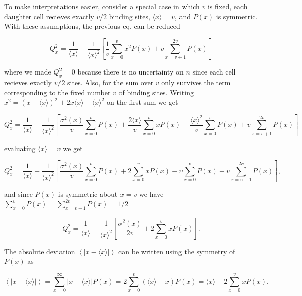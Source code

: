 To make interpretations easier, consider a special case in which $v$ is fixed, each daughter cell recieves exactly $v/2$ binding sites, $\langle x\rangle = v$, and $P(x)$ is symmetric. With these assumptions, the previous eq. can be reduced

\begin{equation*}
  Q_x^2 = \frac{1}{\langle x\rangle} - \frac{1}{\langle x\rangle^2}\left[\frac{1}{v}\sum_{x=0}^vx^2P(x)+v\sum_{x=v+1}^{2v}P(x)\right]
\end{equation*}

where we made $Q_v^2=0$ because there is no uncertainty on $n$ since each cell recieves exactly $v/2$ sites. Also, for the sum over $v$ only survives the term corresponding to the fixed number $v$ of binding sites. Writing $x^2 = \left(x-\langle x\rangle\right)^2 + 2x\langle x\rangle - \langle x\rangle^2$ on the first sum we get 

\begin{equation*}
  Q_x^2 = \frac{1}{\langle x\rangle}-\frac{1}{\langle x\rangle^2}\left[\frac{\sigma^2(x)}{v}\sum_{x=0}^vP(x)+\frac{2\langle x\rangle}{v}\sum_{x=0}^vxP(x)-\frac{\langle x\rangle^2}{v}\sum_{x=0}^vP(x)+v\sum_{x=v+1}^{2v}P(x)\right]
\end{equation*}

evaluating $\langle x\rangle = v$ we get

\begin{equation*}
  Q_x^2 = \frac{1}{\langle x\rangle}-\frac{1}{\langle x\rangle^2}\left[\frac{\sigma^2(x)}{v}\sum_{x=0}^vP(x)+2\sum_{x=0}^vxP(x)-v\sum_{x=0}^vP(x)+v\sum_{x=v+1}^{2v}P(x)\right],
\end{equation*}

and since $P(x)$ is symmetric about $x=v$ we have $\sum_{x=0}^vP(x) = \sum_{x=v+1}^{2v}P(x) = 1/2$

\begin{equation}
  Q_x^2 = \frac{1}{\langle x\rangle}-\frac{1}{\langle x\rangle^2}\left[\frac{\sigma^2(x)}{2v}+2\sum_{x=0}^vxP(x)\right].
\end{equation}

The absolute deviation $\left\langle\left|x-\langle x\rangle\right|\right\rangle$ can be written using the symmetry of $P(x)$ as

\begin{equation}
  \left\langle\left|x-\langle x\rangle\right|\right\rangle = \sum_{x=0}^\infty\left|x-\langle x\rangle\right|P(x) = 2\sum_{x=0}^v\left(\langle x\rangle-x\right)P(x) = \langle x\rangle-2\sum_{x=0}^vxP(x).
\end{equation}

